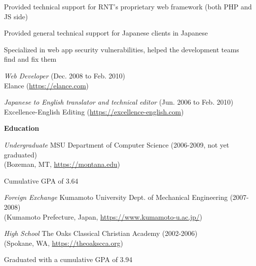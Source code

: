 \documentclass[10pt, a4paper]{article}
\begin{document}
\begin{itemize*}
    \begin{itemize*}
      \item Provided technical support for RNT's proprietary web framework (both PHP and JS side)
      \item Provided general technical support for Japanese clients in Japanese
      \item Specialized in web app security vulnerabilities, helped the development teams find and fix them
    \end{itemize*}
  \item \emph{Web Developer} (Dec. 2008 to Feb. 2010)\\
    Elance (\url{https://elance.com})
  \item \emph{Japanese to English translator and technical editor} (Jun. 2006 to Feb. 2010)\\
    Excellence-English Editing (\url{https://excellence-english.com})
\end{itemize*}
\textbf{Education}
\begin{itemize*}
  \item \emph{Undergraduate} MSU Department of Computer Science (2006-2009, not yet graduated)\\
    (Bozeman, MT, \url{https://montana.edu})
    \begin{itemize*}
      \item Cumulative GPA of 3.64
    \end{itemize*}
  \item \emph{Foreign Exchange} Kumamoto University Dept. of Mechanical Engineering (2007-2008)\\
    (Kumamoto Prefecture, Japan, \url{https://www.kumamoto-u.ac.jp/})
  \item \emph{High School} The Oaks Classical Christian Academy (2002-2006)\\
    (Spokane, WA, \url{https://theoakscca.org})
    \begin{itemize*}
      \item Graduated with a cumulative GPA of 3.94
    \end{itemize*}
\end{itemize*}
\end{document}
